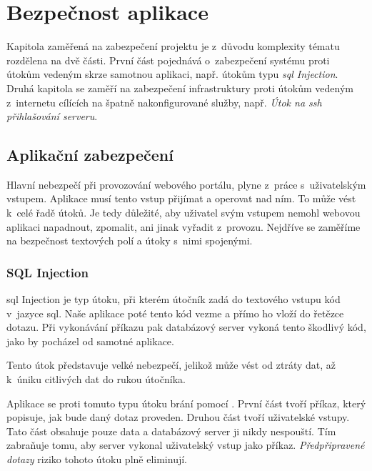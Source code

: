 \section{Bezpečnost aplikace}\label{sec:security}

Kapitola zaměřená na zabezpečení projektu \bso{} je z~důvodu komplexity tématu rozdělena na dvě části.
První část pojednává o~zabezpečení systému proti útokům vedeným skrze samotnou aplikaci, např. útokům typu \emph{\acrshort{sql} Injection}.
Druhá kapitola se zaměří na zabezpečení infrastruktury proti útokům vedeným z~internetu cílících na špatně nakonfigurované služby,
např. \emph{Útok na \acrshort{ssh} přihlašování serveru}.

\subsection{Aplikační zabezpečení}

Hlavní nebezpečí při provozování webového portálu, plyne z~práce s~uživatelským vstupem.
Aplikace musí tento vstup přijímat a operovat nad ním. To může vést k~celé řadě útoků.
Je tedy důležité, aby uživatel svým vstupem nemohl webovou aplikaci napadnout, zpomalit, ani jinak vyřadit z~provozu.
Nejdříve se zaměříme na bezpečnost textových polí a útoky s~nimi spojenými.

\subsubsection{SQL Injection}

\acrshort{sql} Injection\cite{sqlinject} je typ útoku, při kterém útočník zadá do textového vstupu kód v~jazyce \acrshort{sql}.
Naše aplikace poté tento kód vezme a přímo ho vloží do řetězce dotazu.
Při vykonávání příkazu pak databázový server vykoná tento škodlivý kód, jako by pocházel od samotné aplikace.

Tento útok představuje velké nebezpečí, jelikož může vést od ztráty dat, až k~úniku citlivých dat do rukou útočníka.

Aplikace \bso{} se proti tomuto typu útoku brání pomocí .
První část tvoří příkaz, který popisuje, jak bude daný dotaz proveden.
Druhou část tvoří uživatelské vstupy.
Tato část obsahuje pouze data a databázový server ji nikdy nespouští.
Tím zabraňuje tomu, aby server vykonal uživatelský vstup jako příkaz.
\emph{Předpřipravené dotazy}\cite{mysqlprepstmt} riziko tohoto útoku plně eliminují.


